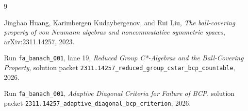 \documentclass[11pt]{article}
\begin{document}
\begin{thebibliography}{9}

Jinghao Huang, Karimbergen Kudaybergenov, and Rui Liu,
\emph{The ball-covering property of von Neumann algebras and noncommutative
symmetric spaces},
arXiv:2311.14257, 2023.

Run \texttt{fa\_banach\_001}, lane 19,
\emph{Reduced Group C*-Algebras and the Ball-Covering Property},
solution packet
\texttt{2311.14257\_reduced\_group\_cstar\_bcp\_countable}, 2026.

Run \texttt{fa\_banach\_001},
\emph{Adaptive Diagonal Criteria for Failure of BCP},
solution packet
\texttt{2311.14257\_adaptive\_diagonal\_bcp\_criterion}, 2026.

\end{thebibliography}
\end{document}
